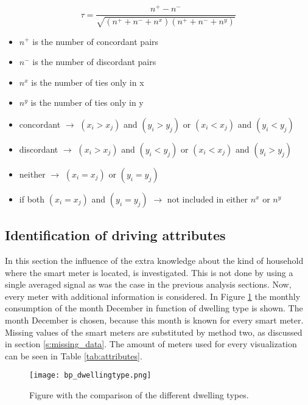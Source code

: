 \begin{equation}\label{eq:kendall}
	\tau = \frac{n^+-n^-}{\sqrt{(n^++n^-+n^x)(n^++n^-+n^y)}}
\end{equation}
\begin{itemize}
	\item $ n^+ $ is the number of concordant pairs
	\item $ n^- $ is the number of discordant pairs
	\item $ n^x $ is the number of ties only in x
	\item $ n^y $ is the number of ties only in y
	\item concordant $\rightarrow $ $ (x_i > x_j ) $ and $ (y_i > y_j ) $ or $ (x_i < x_j ) $ and $ (y_i < y_j ) $
	\item discordant $\rightarrow $ $ (x_i > x_j ) $ and $ (y_i < y_j ) $ or $ (x_i < x_j ) $ and $ (y_i > y_j ) $
	\item neither $\rightarrow $ $ (x_i = x_j ) $ or $ (y_i = y_j ) $
	\item if both $ (x_i = x_j ) $ and $ (y_i = y_j ) $ $\rightarrow $ not included in either $ n^x $ or $ n^y $
\end{itemize}






\subsection{Identification of driving attributes} \label{s:Identification of driving attributes}
In this section the influence of the extra knowledge about the kind of household where the smart meter is located, is investigated. This is not done by using a single averaged signal as was the case in the previous analysis sections. Now, every meter with additional information is considered. In Figure \ref{fig:bp_dwellingtype} the monthly consumption of the month December in function of dwelling type is shown. The month December is chosen, because this month is known for every smart meter. Missing values of the smart meters are substituted by method two, as discussed in section \ref{s:missing_data}. The amount of meters used for every visualization can be seen in Table \ref{tab:attributes}.


\begin{figure}[h!]
	\centering
	\texttt{[image: bp\_dwellingtype.png]}
	\caption{Figure with the comparison of the different dwelling types.}
	\label{fig:bp_dwellingtype}
\end{figure}





